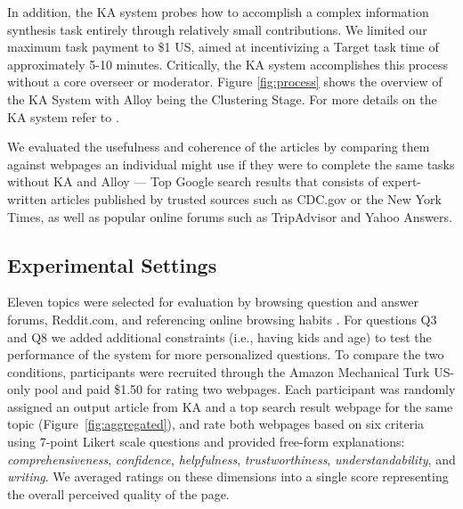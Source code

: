 In addition, the KA system probes how to accomplish a complex information synthesis task entirely through relatively small contributions. We limited our maximum task payment to \$1 US, aimed at incentivizing a Target task time of approximately 5-10 minutes. Critically, the KA system accomplishes this process without a core overseer or moderator. Figure \ref{fig:process} shows the overview of the KA System with Alloy being the Clustering Stage. For more details on the KA system refer to \cite{ka}.

We evaluated the usefulness and coherence of the articles by comparing them against webpages an individual might use if they were to complete the same tasks without KA and Alloy --- Top Google search results that consists of expert-written articles published by trusted sources such as CDC.gov or the New York Times, as well as popular online forums such as TripAdvisor and Yahoo Answers.

\subsection{Experimental Settings}

Eleven topics were selected for evaluation by browsing question and answer forums, Reddit.com, and referencing online browsing habits \cite{pewReport}. For questions Q3 and Q8 we added additional constraints (i.e., having kids and age) to test the performance of the system for more personalized questions.
To compare the two conditions, participants were recruited through the Amazon Mechanical Turk US-only pool and paid \$1.50 for rating two webpages. Each participant was randomly assigned an output article from KA and a top search result webpage for the same topic (Figure~\ref{fig:aggregated}), and rate both webpages based on six criteria using 7-point Likert scale questions and provided free-form explanations: \emph{comprehensiveness}, \emph{confidence}, \emph{helpfulness}, \emph{trustworthiness}, \emph{understandability}, and \emph{writing}. We averaged ratings on these dimensions into a single score representing the overall perceived quality of the page.


